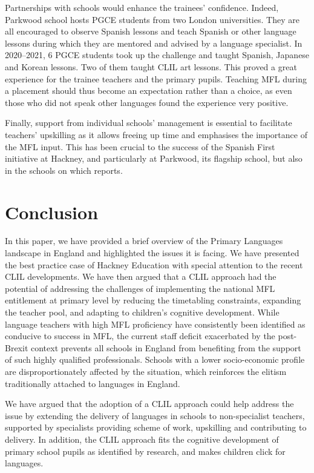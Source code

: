 \documentclass[output=paper]{langscibook}
\begin{document}
Partnerships with schools would enhance the trainees’ confidence. Indeed, Parkwood school hosts PGCE students from two London universities. They are all encouraged to observe Spanish lessons and teach Spanish or other language lessons during which they are mentored and advised by a language specialist. In 2020--2021, 6 PGCE students took up the challenge and taught Spanish, Japanese and Korean lessons. Two of them taught CLIL art lessons. This proved a great experience for the trainee teachers and the primary pupils. Teaching MFL during a placement should thus become an expectation rather than a choice, as even those who did not speak other languages found the experience very positive.

Finally, support from individual schools’ management is essential to facilitate teachers’ upskilling as it allows freeing up time and emphasises the importance of the MFL input. This has been crucial to the success of the Spanish First initiative at Hackney, and particularly at Parkwood, its flagship school, but also in the schools on which \citet{Woodfield2021} reports.

\section{Conclusion}

In this paper, we have provided a brief overview of the Primary Languages landscape in England and highlighted the issues it is facing. We have presented the best practice case of Hackney Education with special attention to the recent CLIL developments. We have then argued that a CLIL approach had the potential of addressing the challenges of implementing the national MFL entitlement at primary level by reducing the timetabling constraints, expanding the teacher pool, and adapting to children’s cognitive development. While language teachers with high MFL proficiency have consistently been identified as conducive to success in MFL, the current staff deficit exacerbated by the post-Brexit context prevents all schools in England from benefiting from the support of such highly qualified professionals. Schools with a lower socio-economic profile are disproportionately affected by the situation, which reinforces the elitism traditionally attached to languages in England. 

We have argued that the adoption of a CLIL approach could help address the issue by extending the delivery of languages in schools to non-specialist teachers, supported by specialists providing scheme of work, upskilling and contributing to delivery. In addition, the CLIL approach fits the cognitive development of primary school pupils as identified by research, and makes children click for languages.
\end{document}
